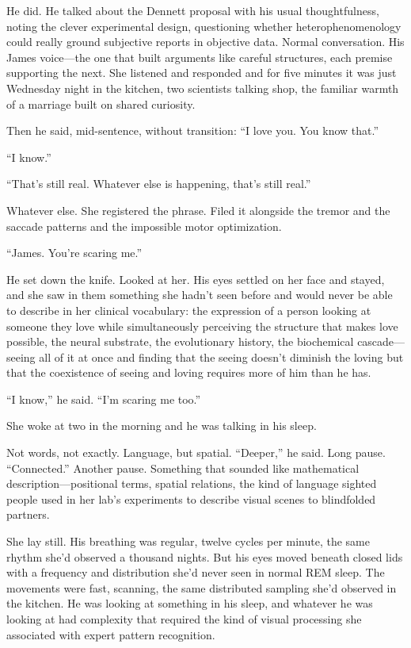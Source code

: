 He did. He talked about the Dennett proposal with his usual thoughtfulness, noting the clever experimental design, questioning whether heterophenomenology could really ground subjective reports in objective data. Normal conversation. His James voice---the one that built arguments like careful structures, each premise supporting the next. She listened and responded and for five minutes it was just Wednesday night in the kitchen, two scientists talking shop, the familiar warmth of a marriage built on shared curiosity.

Then he said, mid-sentence, without transition: ``I love you. You know that.''

``I know.''

``That's still real. Whatever else is happening, that's still real.''

Whatever else. She registered the phrase. Filed it alongside the tremor and the saccade patterns and the impossible motor optimization.

``James. You're scaring me.''

He set down the knife. Looked at her. His eyes settled on her face and stayed, and she saw in them something she hadn't seen before and would never be able to describe in her clinical vocabulary: the expression of a person looking at someone they love while simultaneously perceiving the structure that makes love possible, the neural substrate, the evolutionary history, the biochemical cascade---seeing all of it at once and finding that the seeing doesn't diminish the loving but that the coexistence of seeing and loving requires more of him than he has.

``I know,'' he said. ``I'm scaring me too.''

\bigskip

She woke at two in the morning and he was talking in his sleep.

Not words, not exactly. Language, but spatial. ``Deeper,'' he said. Long pause. ``Connected.'' Another pause. Something that sounded like mathematical description---positional terms, spatial relations, the kind of language sighted people used in her lab's experiments to describe visual scenes to blindfolded partners.

She lay still. His breathing was regular, twelve cycles per minute, the same rhythm she'd observed a thousand nights. But his eyes moved beneath closed lids with a frequency and distribution she'd never seen in normal REM sleep. The movements were fast, scanning, the same distributed sampling she'd observed in the kitchen. He was looking at something in his sleep, and whatever he was looking at had complexity that required the kind of visual processing she associated with expert pattern recognition.

